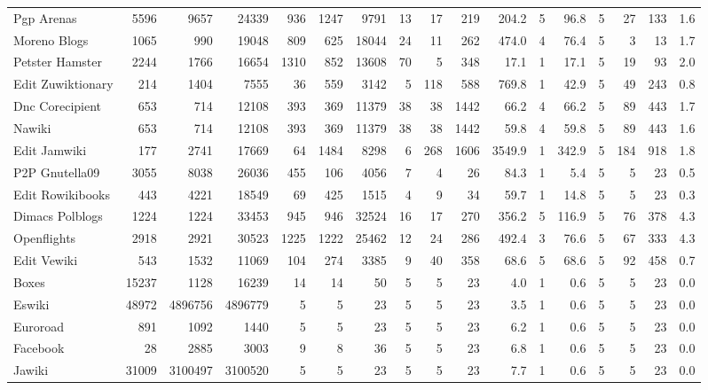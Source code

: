 \begin{landscape}
\begin{table}[htbp]
\begin{tabular}{l *{16}{r}}
    Pgp Arenas & 5596 & 9657 & 24339 & 936 & 1247 & 9791 & 13 & 17 & 219 & 204.2 & 5 & 96.8 & 5 & 27 & 133 & 1.6 \\
    Moreno Blogs & 1065 & 990 & 19048 & 809 & 625 & 18044 & 24 & 11 & 262 & 474.0 & 4 & 76.4 & 5 & 3 & 13 & 1.7 \\
    Petster Hamster & 2244 & 1766 & 16654 & 1310 & 852 & 13608 & 70 & 5 & 348 & 17.1 & 1 & 17.1 & 5 & 19 & 93 & 2.0 \\
    Edit Zuwiktionary & 214 & 1404 & 7555 & 36 & 559 & 3142 & 5 & 118 & 588 & 769.8 & 1 & 42.9 & 5 & 49 & 243 & 0.8 \\
    Dnc Corecipient & 653 & 714 & 12108 & 393 & 369 & 11379 & 38 & 38 & 1442 & 66.2 & 4 & 66.2 & 5 & 89 & 443 & 1.7 \\
    Nawiki & 653 & 714 & 12108 & 393 & 369 & 11379 & 38 & 38 & 1442 & 59.8 & 4 & 59.8 & 5 & 89 & 443 & 1.6 \\
    Edit Jamwiki & 177 & 2741 & 17669 & 64 & 1484 & 8298 & 6 & 268 & 1606 & 3549.9 & 1 & 342.9 & 5 & 184 & 918 & 1.8 \\
    \midrule
    P2P Gnutella09 & 3055 & 8038 & 26036 & 455 & 106 & 4056 & 7 & 4 & 26 & 84.3 & 1 & 5.4 & 5 & 5 & 23 & 0.5 \\
    Edit Rowikibooks & 443 & 4221 & 18549 & 69 & 425 & 1515 & 4 & 9 & 34 & 59.7 & 1 & 14.8 & 5 & 5 & 23 & 0.3 \\
    Dimacs Polblogs & 1224 & 1224 & 33453 & 945 & 946 & 32524 & 16 & 17 & 270 & 356.2 & 5 & 116.9 & 5 & 76 & 378 & 4.3 \\
    Openflights & 2918 & 2921 & 30523 & 1225 & 1222 & 25462 & 12 & 24 & 286 & 492.4 & 3 & 76.6 & 5 & 67 & 333 & 4.3 \\
    Edit Vewiki & 543 & 1532 & 11069 & 104 & 274 & 3385 & 9 & 40 & 358 & 68.6 & 5 & 68.6 & 5 & 92 & 458 & 0.7 \\
    \midrule
    Boxes & 15237 & 1128 & 16239 & 14 & 14 & 50 & 5 & 5 & 23 & 4.0 & 1 & 0.6 & 5 & 5 & 23 & 0.0 \\
    Eswiki & 48972 & 4896756 & 4896779 & 5 & 5 & 23 & 5 & 5 & 23 & 3.5 & 1 & 0.6 & 5 & 5 & 23 & 0.0 \\
    Euroroad & 891 & 1092 & 1440 & 5 & 5 & 23 & 5 & 5 & 23 & 6.2 & 1 & 0.6 & 5 & 5 & 23 & 0.0 \\
    Facebook & 28 & 2885 & 3003 & 9 & 8 & 36 & 5 & 5 & 23 & 6.8 & 1 & 0.6 & 5 & 5 & 23 & 0.0 \\
    Jawiki & 31009 & 3100497 & 3100520 & 5 & 5 & 23 & 5 & 5 & 23 & 7.7 & 1 & 0.6 & 5 & 5 & 23 & 0.0 \\

\end{tabular}
\end{table}
\end{landscape}
